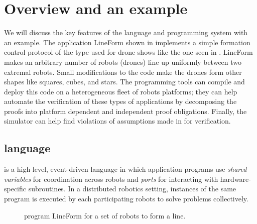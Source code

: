 \section{Overview and an example}
\label{sec:overview}

\newcommand{\LineForm}{\textsf{LineForm}\xspace}
\newcommand{\Motion}{\emph{Motion}\xspace}

We will discuss the key features of the \lgname language and programming system with an example.
The \lgname application \LineForm shown in  implements a simple formation control protocol of the type  used for drone shows like the one seen in .
\LineForm makes an arbitrary number of robots (drones) line up uniformly between two extremal robots.
Small modifications to the code make the drones form other shapes like squares, cubes, and stars.
The \lgname programming tools can compile and deploy this code on a heterogeneous fleet of robots platforms; they can  help automate the verification of these types of applications by decomposing the proofs into platform dependent and independent proof obligations. Finally, the \lgname simulator can help find violations of assumptions made in for verification.

\subsection{\lgname language}
\label{sec:koord-language}
\lgname is a high-level, event-driven language in which application programs use \emph{shared variables} for coordination across robots
and \emph{ports} for interacting with hardware-specific subroutines.
In a distributed robotics setting, instances of the same \lgname program is executed by each participating robots to solve problems collectively.

\begin{figure}[h!]
    {
        
    }
    {
        
    }
    \caption{\lgname program \LineForm for a set of robots to form a line.}
    \label{fig:lineform}
\end{figure}

